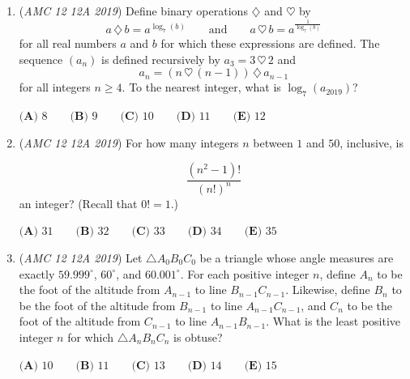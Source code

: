 \begin{enumerate}
	\item (\textit{AMC 12 12A 2019}) Define binary operations $\diamondsuit$ and $\heartsuit$ by 
 \[a \, \diamondsuit \, b = a^{\log_{7}(b)} \qquad \text{and} \qquad a  \, \heartsuit \, b = a^{\frac{1}{\log_{7}(b)}}\]for all real numbers $a$ and $b$ for which these expressions are defined. The sequence $(a_n)$ is defined recursively by $a_3 = 3\, \heartsuit\, 2$ and 
 \[a_n = (n\, \heartsuit\, (n-1)) \,\diamondsuit\, a_{n-1}\]for all integers $n \geq 4$. To the nearest integer, what is $\log_{7}(a_{2019})$?


 $\textbf{(A) } 8 \qquad  \textbf{(B) } 9 \qquad \textbf{(C) } 10 \qquad \textbf{(D) } 11 \qquad \textbf{(E) } 12$


	\item (\textit{AMC 12 12A 2019}) For how many integers $n$ between $1$ and $50$, inclusive, is

 \[\frac{(n^2-1)!}{(n!)^n}\]
an integer? (Recall that $0! = 1$.)


 $\textbf{(A) } 31 \qquad \textbf{(B) } 32 \qquad \textbf{(C) } 33 \qquad \textbf{(D) } 34 \qquad \textbf{(E) } 35$


	\item (\textit{AMC 12 12A 2019}) Let $\triangle A_0B_0C_0$ be a triangle whose angle measures are exactly $59.999^\circ$, $60^\circ$, and $60.001^\circ$. For each positive integer $n$, define $A_n$ to be the foot of the altitude from $A_{n-1}$ to line $B_{n-1}C_{n-1}$. Likewise, define $B_n$ to be the foot of the altitude from $B_{n-1}$ to line $A_{n-1}C_{n-1}$, and $C_n$ to be the foot of the altitude from $C_{n-1}$ to line $A_{n-1}B_{n-1}$. What is the least positive integer $n$ for which $\triangle A_nB_nC_n$ is obtuse?


 $\textbf{(A) } 10 \qquad \textbf{(B) }11 \qquad \textbf{(C) } 13\qquad \textbf{(D) } 14 \qquad \textbf{(E) } 15$


\end{enumerate}